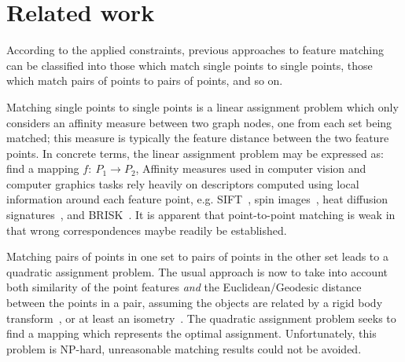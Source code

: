 \section{Related work}
\label{sec:related}

According to the applied constraints,
previous approaches to feature matching can be classified into those which match single points to single points, those which match pairs of points to pairs of points, and so on.

Matching single points to single points is a linear assignment problem which only considers an affinity measure between two graph nodes, one from each set being matched;
this measure is typically the feature distance between the two feature points.
In concrete terms, the linear assignment problem may be expressed as: find a mapping $f:\ P_1\to P_2$,
Affinity measures used in computer vision and computer graphics tasks rely heavily on descriptors computed using local information around each feature point,
e.g. SIFT~\cite{Lowe04}, spin images~\cite{Johnson99}, heat diffusion signatures~\cite{Sun09}, and BRISK~\cite{Leutenegger11}.
It is apparent that point-to-point matching is weak in that wrong correspondences maybe readily be established.

Matching pairs of points in one set to pairs of points in the other set leads to a quadratic assignment problem.
The usual approach is now to take into account both similarity of the point features \emph{and} the Euclidean/Geodesic distance between the points in a pair,
assuming the objects are related by a rigid body transform~\cite{Leordeanu05}, or at least an isometry~\cite{li08,Tevs09,Ovsjanikov10,Tevs11,SahilliogluY11,Windheuser11}.
The quadratic assignment problem seeks to find a mapping which represents the optimal assignment.
Unfortunately, this problem is NP-hard, unreasonable matching results could not be avoided.

